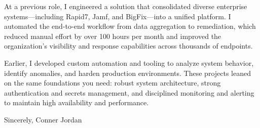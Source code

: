 \documentclass[letterpaper,11pt]{article}
\begin{document}
At a previous role, I engineered a solution that consolidated diverse enterprise systems—including Rapid7, Jamf, and BigFix—into a unified platform. I automated the end-to-end workflow from data aggregation to remediation, which reduced manual effort by over 100 hours per month and improved the organization's visibility and response capabilities across thousands of endpoints.

\vspace{16pt}

Earlier, I developed custom automation and tooling to analyze system behavior, identify anomalies, and harden production environments. These projects leaned on the same foundations you need: robust system architecture, strong authentication and secrets management, and disciplined monitoring and alerting to maintain high availability and performance.

\vspace{16pt}

Sincerely,  
Conner Jordan
\end{document}
